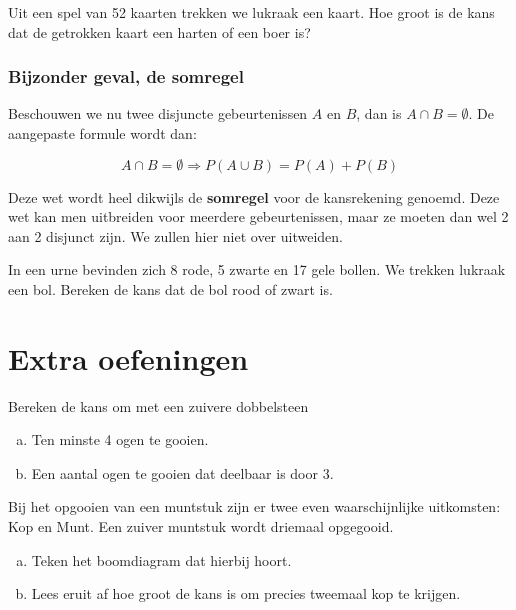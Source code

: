 \documentclass[12pt,a4paper,twoside]{article}
\begin{document}
\begin{oefening}
Uit een spel van 52 kaarten trekken we lukraak een kaart. Hoe groot is de kans dat de
getrokken kaart een harten of een boer is?
\end{oefening}

\subsubsection{Bijzonder geval, de somregel}
Beschouwen we nu twee disjuncte gebeurtenissen $A$ en $B$, dan is $A \cap B = \emptyset$.
De aangepaste formule wordt dan:\\
\begin{mdframed}
$$A \cap B = \emptyset \Rightarrow P(A\cup B)=P(A)+P(B)$$
\end{mdframed}
Deze wet wordt heel dikwijls de {\bf somregel} voor de kansrekening genoemd. Deze wet
kan men uitbreiden voor meerdere gebeurtenissen, maar ze moeten dan wel 2 aan 2
disjunct zijn. We zullen hier niet over uitweiden.

\begin{oefening}
In een urne bevinden zich 8 rode, 5 zwarte en 17 gele bollen. We trekken lukraak een
bol. Bereken de kans dat de bol rood of zwart is.
\end{oefening}

\cleardoublepage
\section{Extra oefeningen}

\begin{oefening}
Bereken de kans om met een zuivere dobbelsteen
\begin{enumerate}[(a)]
  \item Ten minste 4 ogen te gooien.
  \item Een aantal ogen te gooien dat deelbaar is door 3.
\end{enumerate}
\end{oefening}

\begin{oefening}
Bij het opgooien van een muntstuk zijn er twee even waarschijnlijke uitkomsten: Kop en Munt. Een zuiver muntstuk wordt driemaal opgegooid.
\begin{enumerate}[(a)]
  \item Teken het boomdiagram dat hierbij hoort.
  \item Lees eruit af hoe groot de kans is om precies tweemaal kop te krijgen.
\end{enumerate}
\end{oefening}
\end{document}
